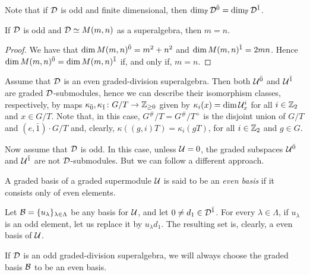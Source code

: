 Note that if $\mathcal{D}$ is odd and finite dimensional, then $\dim_{\mathbb{F}} \mathcal{D}^{\bar0} = \dim_{\mathbb{F}} \mathcal{D}^{\bar1}$. 

\begin{lemma}\label{lemma:odd-M-m=n}
    If $\mathcal{D}$ is odd and $\mathcal{D} \simeq M(m,n)$ as a superalgebra, then $m = n$. 
\end{lemma}

\begin{proof}
    We have that $\dim M(m,n)^{\bar0} = m^2 + n^2$ and $\dim M(m,n)^{\bar1} = 2mn$. 
    Hence $\dim M(m,n)^{\bar0} = \dim M(m,n)^{\bar1}$ if, and only if, $m=n$. 
\end{proof}



Assume that $\mathcal{D}$ is an even graded-division superalgebra. 
Then both $\mathcal U^{\bar0}$ and $\mathcal U^{\bar1}$ are graded $\mathcal{D}$-submodules, hence we can describe their isomorphism classes, respectively, by maps $\kappa_{\bar{0}}, \kappa_{\bar{1}}\colon G/T \to \mathbb{Z}_{\geq 0}$ given by $\kappa_i (x) = \dim \mathcal U^i_x$ for all $i\in \mathbb{Z}_2$ and $x\in G/T$. 
Note that, in this case, $G^\#/T = G^\#/T^+$ is the disjoint union of $G/T$ and $(e, \bar 1) \cdot G/T$ and, clearly, $\kappa ((g,i)T) = \kappa_i (gT)$, for all $i\in \mathbb{Z}_2$ and $g\in G$. 

Now assume that $\mathcal{D}$ is odd. 
In this case, unless $\mathcal U = 0$, the graded subspaces $\mathcal U^{\bar0}$ and $\mathcal U^{\bar1}$ are not $\mathcal{D}$-submodules. 
But we can follow a different approach.

\begin{defi}
    A graded basis of a graded supermodule $\mathcal U$ is said to be an \emph{even basis} if it consists only of even elements.
\end{defi}

Let $\mathcal B = \{u_\lambda\}_{\lambda \in \Lambda}$ be any basis for $\mathcal U$, and let $0 \neq d_1\in \mathcal{D}^{\bar1}$. 
For every $\lambda \in \Lambda$, if $u_\lambda$ is an odd element, let us replace it by $u_\lambda d_1$. 
The resulting set is, clearly, a even basis of $\mathcal U$.

\begin{convention}\label{conv:pick-even-basis}
    If $\mathcal{D}$ is an odd graded-division superalgebra, we will always choose the graded basis $\mathcal B$ to be an even basis.
\end{convention}

